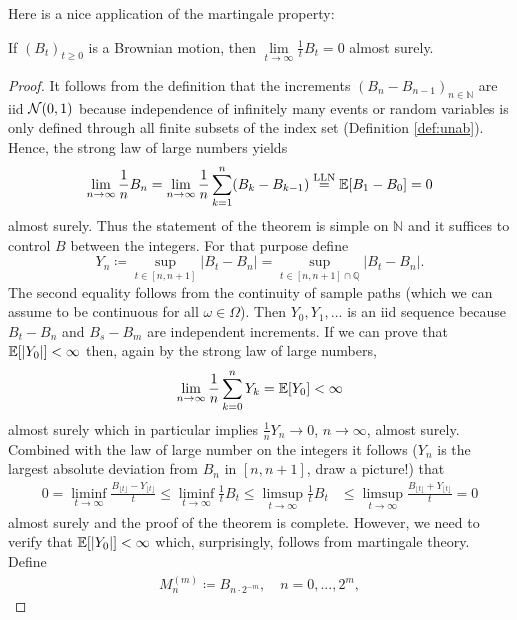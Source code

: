 Here is a nice application of the martingale property:
\begin{laussagewerkzeug}
\begin{prop}
	If $(B_t)_{t\geq 0}$ is a Brownian motion, then $\lim\limits_{t\to\infty} \frac{1}{t}B_t = 0$ almost surely.
\end{prop}
\end{laussagewerkzeug}
\begin{proof}[Proof]
	It follows from the definition that the increments
	$(B_n-B_{n-1})_{n\in\mathbb{N}}$ are iid $\mathcal{N}(0,1)$ because independence of infinitely many events or random variables is only defined through all finite subsets of the index set (Definition \ref{def:unab}). Hence, the strong law of large numbers yields
	\begin{align*}
		\lim_{n\to\infty} \frac{1}{n} B_n = \lim_{n\to\infty} \frac{1}{n}\sum_{k=1}^n (B_{k}-B_{k-1})  \overset{\text{LLN}}{=} \mathbb{E}[B_1-B_0] = 0
	\end{align*}
	almost surely. Thus the statement of the theorem is simple on $\mathbb{N}$ and it suffices to control $B$ between the integers. For that purpose define $$Y_n \coloneqq \sup_{t\in[n,n+1]} \lvert B_t - B_n \rvert = \sup_{t\in[n,n+1]\cap \mathbb{Q}} \lvert B_t - B_n \rvert.$$ The second equality follows from the continuity of sample paths (which we can assume to be continuous for all $\omega\in \Omega$).
	Then $Y_0,Y_1,...$ is an iid sequence because $B_t- B_n$ and $B_s - B_m$ are independent increments. If we can prove that $\mathbb{E} [\lvert Y_0 \rvert]< \infty$ then, again by the strong law of large numbers, $$\lim\limits_{n\to\infty} \frac{1}{n}\sum\limits_{k=0}^n Y_k = \mathbb{E}[Y_0] < \infty$$ almost surely which in particular implies $\frac{1}{n}Y_n \rightarrow 0$, $n\to\infty$, almost surely. Combined with the law of large number on the integers it follows ($Y_n$ is the largest absolute deviation from $B_n$ in $[n,n+1]$, draw a picture!) that
	\begin{align*}
		0=\liminf_{t\to\infty}\frac{B_{\lfloor t \rfloor}-Y_{\lfloor t \rfloor}}{t}\leq\liminf_{t\to\infty}\frac{1}{t}B_t\leq \limsup_{t\to\infty}\frac{1}{t}B_t &\leq \limsup_{t\to\infty}\frac{B_{\lfloor t \rfloor}+Y_{\lfloor t \rfloor}}{t} = 0
	\end{align*}
	almost surely and the proof of the theorem is complete. However, we need to verify that $\mathbb{E}[\lvert Y_0 \rvert ]< \infty$ which, surprisingly, follows from martingale theory. Define
	\begin{align*}
		M_n^{(m)} \coloneqq B_{n\cdot 2^{-m}}, \quad n=0,...,2^m,

\end{align*}
\end{proof}

